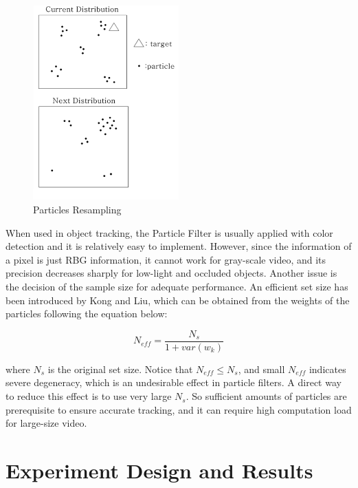 \documentclass[10pt,twocolumn,letterpaper]{article}
\begin{document}
\begin{figure}[h]
     \centering
       \includegraphics[width=0.5\textwidth]{Particle_Resampling.png}
        \caption{\small{Particles Resampling}}
        \label{fig: p resample}
 \end{figure}

When used in object tracking, the Particle Filter is usually applied with color detection and it is relatively easy to implement. However, since the information of a pixel is just RBG information, it cannot work for gray-scale video, and its precision decreases sharply for low-light and occluded objects. Another issue is the decision of the sample size for adequate performance. An efficient set size has been introduced by Kong and Liu\cite{ref:doucet}, which can be obtained from the weights of the particles following the equation below:

\begin{equation}
N_{eff}=\frac{N_s}{1+var(w_k)}
\end{equation}

where $N_s$ is the original set size. Notice that $N_{eff} \leq N_s$, and small $N_{eff}$ indicates severe degeneracy, which is an undesirable effect in particle filters. A direct way to reduce this effect is to use very large $N_s$. So sufficient amounts of particles are prerequisite to ensure accurate tracking, and it can require high computation load for large-size video.

\section{Experiment Design and Results}
\end{document}
